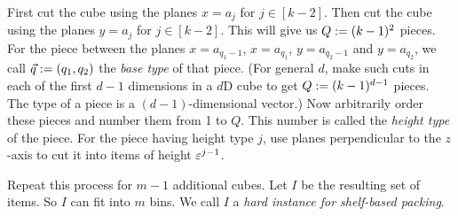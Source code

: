 First cut the cube using the planes $x = a_j$ for $j \in [k-2]$.
Then cut the cube using the planes $y = a_j$ for $j \in [k-2]$.
This will give us $Q := (k-1)^2$ pieces.
For the piece between the planes $x = a_{q_1-1}$, $x = a_{q_1}$,
$y = a_{q_2 - 1}$ and $y = a_{q_2}$, we call $\vec{q} := (q_1, q_2)$
the \emph{base type} of that piece.
(For general $d$, make such cuts in each of the first $d-1$ dimensions
in a $d$D cube to get $Q := (k-1)^{d-1}$ pieces.
The type of a piece is a $(d-1)$-dimensional vector.)
Now arbitrarily order these pieces and number them from 1 to $Q$.
This number is called the \emph{height type} of the piece.
For the piece having height type $j$, use planes perpendicular to the $z$-axis to cut it into
items of height $\varepsilon^{j-1}$.

Repeat this process for $m-1$ additional cubes.
Let $I$ be the resulting set of items. So $I$ can fit into $m$ bins.
We call $I$ a \emph{hard instance for shelf-based packing}.

